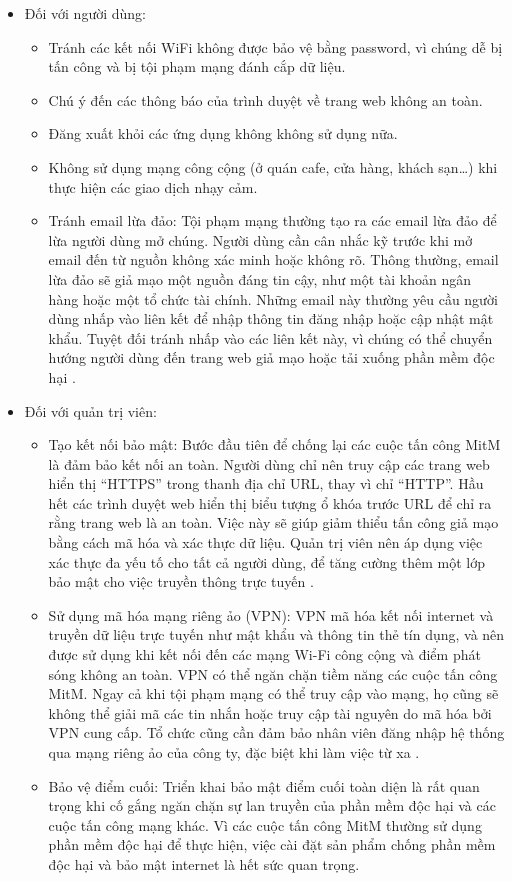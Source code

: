 \begin{itemize}
    \item  Đối với người dùng:

\begin{itemize}
    \item Tránh các kết nối WiFi không được bảo vệ bằng password, vì chúng dễ bị tấn công và bị tội phạm mạng đánh cắp dữ liệu.
    \item Chú ý đến các thông báo của trình duyệt về trang web không an toàn.\cite{ylli2021man}
\item Đăng xuất khỏi các ứng dụng không không sử dụng nữa.
\item  Không sử dụng mạng công cộng (ở quán cafe, cửa hàng, khách sạn…) khi thực hiện các giao dịch nhạy cảm.

\item  Tránh email lừa đảo: Tội phạm mạng thường tạo ra các email lừa đảo để lừa người dùng mở chúng. Người dùng cần cân nhắc kỹ trước khi mở email đến từ nguồn không xác minh hoặc không rõ. Thông thường, email lừa đảo sẽ giả mạo một nguồn đáng tin cậy, như một tài khoản ngân hàng hoặc một tổ chức tài chính. Những email này thường yêu cầu người dùng nhấp vào liên kết để nhập thông tin đăng nhập hoặc cập nhật mật khẩu. Tuyệt đối tránh nhấp vào các liên kết này, vì chúng có thể chuyển hướng người dùng đến trang web giả mạo hoặc tải xuống phần mềm độc hại \cite{ylli2021man}.
\end{itemize}
\item  Đối với quản trị viên:
\begin{itemize}
    \item Tạo kết nối bảo mật: Bước đầu tiên để chống lại các cuộc tấn công MitM là đảm bảo kết nối an toàn. Người dùng chỉ nên truy cập các trang web hiển thị “HTTPS” trong thanh địa chỉ URL, thay vì chỉ “HTTP”. Hầu hết các trình duyệt web hiển thị biểu tượng ổ khóa trước URL để chỉ ra rằng trang web là an toàn. Việc này sẽ giúp giảm thiểu tấn công giả mạo bằng cách mã hóa và xác thực dữ liệu. Quản trị viên nên áp dụng việc xác thực đa yếu tố cho tất cả người dùng, để tăng cường thêm một lớp bảo mật cho việc truyền thông trực tuyến \cite{ylli2021man}.
\item Sử dụng mã hóa mạng riêng ảo (VPN): VPN mã hóa kết nối internet và truyền dữ liệu trực tuyến như mật khẩu và thông tin thẻ tín dụng, và nên được sử dụng khi kết nối đến các mạng Wi-Fi công cộng và điểm phát sóng không an toàn. VPN có thể ngăn chặn tiềm năng các cuộc tấn công MitM. Ngay cả khi tội phạm mạng có thể truy cập vào mạng, họ cũng sẽ không thể giải mã các tin nhắn hoặc truy cập tài nguyên do mã hóa bởi VPN cung cấp. Tổ chức cũng cần đảm bảo nhân viên đăng nhập hệ thống qua mạng riêng ảo của công ty, đặc biệt khi làm việc từ xa \cite{ylli2021man}.
\item  Bảo vệ điểm cuối: Triển khai bảo mật điểm cuối toàn diện là rất quan trọng khi cố gắng ngăn chặn sự lan truyền của phần mềm độc hại và các cuộc tấn công mạng khác. Vì các cuộc tấn công MitM thường sử dụng phần mềm độc hại để thực hiện, việc cài đặt sản phẩm chống phần mềm độc hại và bảo mật internet là hết sức quan trọng.
\end{itemize}
\end{itemize}
